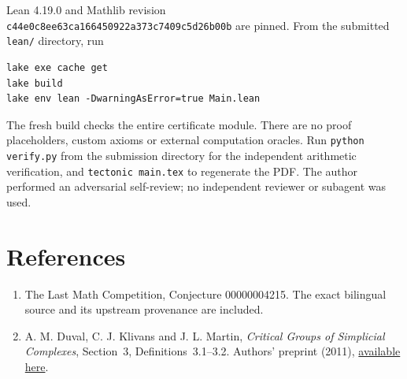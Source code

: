 \documentclass[11pt]{article}
\begin{document}
Lean 4.19.0 and Mathlib revision\\
\texttt{c44e0c8ee63ca166450922a373c7409c5d26b00b} are pinned.
From the submitted \texttt{lean/} directory, run
\begin{verbatim}
lake exe cache get
lake build
lake env lean -DwarningAsError=true Main.lean
\end{verbatim}
The fresh build checks the entire certificate module. There are no
proof placeholders, custom axioms or external computation oracles.
Run \texttt{python verify.py} from the submission directory for the
independent arithmetic verification, and \texttt{tectonic main.tex}
to regenerate the PDF. The author performed an adversarial
self-review; no independent reviewer or subagent was used.

\section*{References}
\begin{enumerate}
\item The Last Math Competition, Conjecture 00000004215. The exact
bilingual source and its upstream provenance are included.
\item A. M. Duval, C. J. Klivans and J. L. Martin,
\emph{Critical Groups of Simplicial Complexes}, Section~3,
Definitions~3.1--3.2. Authors' preprint (2011),
\href{https://www.dam.brown.edu/people/cklivans/critical.pdf}{available here}.
\end{enumerate}
\end{document}
